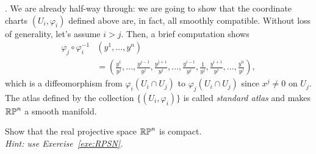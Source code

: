 \begin{example}
  .
  We are already half-way through: we are going to show that the coordinate charts $(U_i, \varphi_i)$ defined above are, in fact, all smoothly compatible.
  Without loss of generality, let's assume $i>j$.
  Then, a brief computation shows
  \begin{align}
    \varphi_j\circ\varphi_i^{-1} & (y^1, \ldots, y^n)                                                                                                                                                 \\
                                 & = \left(\frac{y^1}{y^j},\ldots,\frac{y^{j-1}}{y^j},\frac{y^{j+1}}{y^j},\ldots,\frac{y^{i-1}}{y^j},\frac1{y^j},\frac{y^{i+1}}{y^j}, \ldots, \frac{y^n}{y^j}\right),
  \end{align}
  which is a diffeomorphism from $\varphi_i(U_i\cap U_j)$ to $\varphi_j(U_i\cap U_j)$ since $x^j\neq 0$ on $U_j$.
  The atlas defined by the collection $\{(U_i, \varphi_i)\}$ is called \emph{standard atlas} and makes $\mathbb{RP}^n$ a smooth manifold.
\end{example}

\begin{exercise}
  Show that the real projective space $\mathbb{RP}^n$ is compact.\\
  \textit{\small Hint: use Exercise~\ref{exe:RPSN}.}
\end{exercise}

